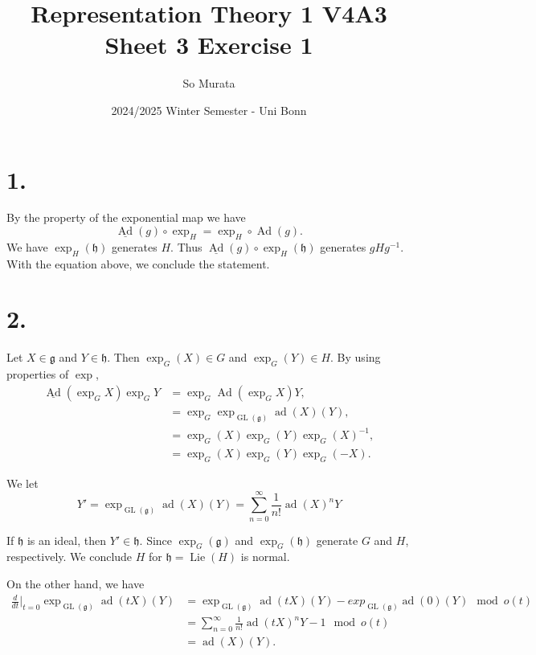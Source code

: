 \documentclass{article}
\title{Representation Theory 1 V4A3 Sheet 3 Exercise 1}
\author{So Murata}
\date{2024/2025 Winter Semester - Uni Bonn}
\numberwithin{equation}{section}
\DeclareMathOperator{\Ad}{Ad}
\DeclareMathOperator{\ad}{ad}
\DeclareMathOperator{\GL}{GL}
\DeclareMathOperator{\Lie}{Lie}
\begin{document}
\maketitle

\section*{1.}

By the property of the exponential map we have
\begin{equation*}
\underline{\Ad}(g)\circ \exp_H = \exp_H\circ\Ad(g).
\end{equation*}
We have $\exp_H(\mathfrak{h})$ generates $H$. Thus $\underline{\Ad}(g)\circ\exp_H(\mathfrak{h})$ generates $gHg^{-1}$. With the equation above, we conclude the statement.

\section*{2.}

Let $X\in\mathfrak{g}$ and $Y\in\mathfrak{h}$. Then $\exp_G(X)\in G$ and $\exp_G(Y)\in H$. By using properties of $\exp$,
\begin{align*}
\underline{\Ad}(\exp_GX)\exp_GY &= \exp_G\Ad(\exp_GX)Y,\\
&=\exp_G\exp_{\GL(\mathfrak{g})}\ad(X)(Y),\\
& = \exp_G(X)\exp_G(Y)\exp_G(X)^{-1},\\
& = \exp_G(X)\exp_G(Y)\exp_G(-X).
\end{align*}

We let
\begin{equation*}
Y'=\exp_{\GL(\mathfrak{g})}\ad(X)(Y) = \sum_{n=0}^\infty {\frac 1 {n!}}\ad(X)^n Y
\end{equation*}

If $\mathfrak{h}$ is an ideal, then $Y'\in \mathfrak{h}$. Since $\exp_G(\mathfrak{g})$ and $\exp_G(\mathfrak{h})$ generate $G$ and $H$, respectively. We conclude $H$ for $\mathfrak{h}=\Lie(H)$ is normal.\\
\par On the other hand,  we have
\begin{align*}
{\frac d {dt}}|_{t=0}\exp_{\GL(\mathfrak{g})}\ad(tX)(Y) & = \exp_{\GL(\mathfrak{g})}\ad(tX)(Y)-exp_{\GL(\mathfrak{g})}\ad(0)(Y)\mod{o(t)}\\
& = \sum_{n=0}^\infty {\frac 1 {n!}}\ad(tX)^n Y-1\mod{o(t)}\\
& = \ad(X)(Y).
\end{align*}
\end{document}
